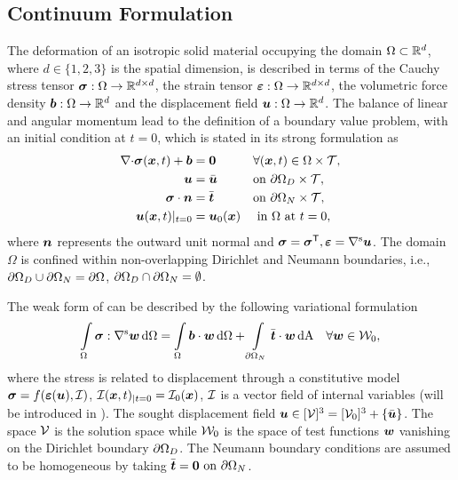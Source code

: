 \subsection{Continuum Formulation}
The deformation of an isotropic solid material occupying the domain $\Omega \subset {\mathbb{ R}}^d$, where $d \in \{1,2,3\}$ is the spatial dimension, is described in terms of the Cauchy stress tensor $\mbox{$\bm \sigma$}:\Omega \rightarrow {\mathbb{ R}}^{d\times d}$, the strain tensor $\mbox{$\bm \varepsilon $}:\Omega \rightarrow {\mathbb{ R}}^{d\times d}$, the volumetric force density $\mbox{$\bm  b$}: \Omega \rightarrow {\mathbb{ R}}^d$ and the displacement field $\mbox{$\bm  u$}:\Omega \rightarrow {\mathbb{ R}}^d$. The balance of linear and angular momentum lead to the definition of a boundary value problem, with an initial condition at $t=0$, which is stated in its strong formulation as \parencite{Holzapfel2000}
\begin{align}
	{\rm \nabla \cdot } \mbox{$\bm \sigma$}(\mbox{$\bm  x$},t)+\mbox{$\bm  b$} & =\mbox{$\bm  0$}      &  & \forall (\mbox{$\bm  x$},t) \in \Omega\times{\cal T},  \nonumber       \\
	\mbox{$\bm  u$}                      & = \bar{\mbox{$\bm  u$}}  &  & \text{on } \partial \Omega_D\times{\cal T},  \label{eq_strong_form} \\
	\mbox{$\bm \sigma$} \cdot \mbox{$\bm  n$}        & = \bar{\mbox{$\bm  t$}}  &  & \text{on } \partial \Omega_N\times{\cal T}, \nonumber               \\
	\mbox{$\bm  u$}(\mbox{$\bm  x$},t)|_{t=0}        & = \mbox{$\bm  u$}_0(\mbox{$\bm  x$}) &  & \text{ in } \Omega \text{ at } t=0,
\end{align}
where $\mbox{$\bm  n$}$ represents the outward unit normal and
$\mbox{$\bm \sigma$} = {\mbox{$\bm \sigma$}}^{\sf T}, \mbox{$\bm \varepsilon $} = {\rm \nabla^s} \mbox{$\bm  u$}$. The domain $\Omega$ is confined within non-overlapping Dirichlet and Neumann boundaries, i.e., $\partial \Omega_D \cup \partial \Omega_N = \partial \Omega$, $\partial \Omega_D \cap \partial \Omega_N = \emptyset$.

The weak form of  can be described by the following variational formulation
\begin{equation}
	\int \displaylimits_\Omega \mbox{$\bm \sigma$}:{\rm \nabla^s} \mbox{$\bm  w$} {\,\rm d} \Omega = \int \displaylimits_\Omega \mbox{$\bm  b$} \cdot \mbox{$\bm  w$} {\,\rm d} \Omega + \displaystyle \int \displaylimits_{\partial \Omega_N} \bar{\mbox{$\bm  t$}} \cdot \mbox{$\bm  w$} {\,\rm d} {\rm A} \quad \forall \mbox{$\bm  w$} \in {\cal W}_0,
	\label{eq_weak_form}
\end{equation}
where the stress is related to displacement through a constitutive model $\mbox{$\bm \sigma$}=f(\mbox{$\bm \varepsilon $}(\mbox{$\bm  u$}),{\cal I})$, ${\cal I}(\mbox{$\bm  x$},t)_{|t=0}={\cal I}_0(\mbox{$\bm  x$})$, ${\cal I}$ is a vector field of internal variables (will be introduced in ). The sought displacement field $\mbox{$\bm  u$} \in [{\cal V}]^3 = [{\cal V}_0]^3 + \{\bar {\mbox{$\bm  u$}}\}$. The space ${\cal V}$ is the solution space while ${\cal W}_0$ is the space of test functions $\mbox{$\bm  w$}$ vanishing on the Dirichlet boundary $\partial \Omega_D$. The Neumann boundary conditions are assumed to be homogeneous by taking $\bar{\mbox{$\bm  t$}}=\mbox{$\bm  0$} \text{ on }\partial \Omega_N$.

